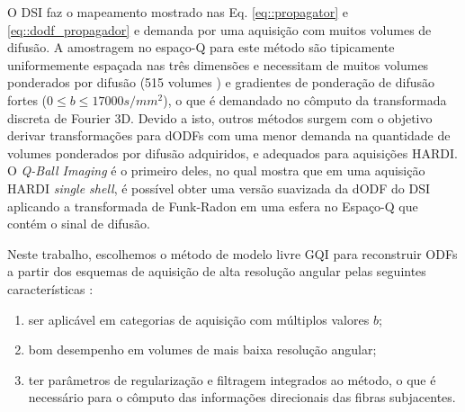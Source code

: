 \documentclass[
    12pt,                %
    oneside,            %
    a4paper,            %
    english,            %
    french,                %
    spanish,            %
    brazil                %
    ]{abntex2}
\begin{document}

O DSI \cite{wedeen2005} faz o mapeamento mostrado nas Eq. \ref{eq::propagator} e \ref{eq::dodf_propagador} e demanda por uma aquisição com muitos volumes de difusão. A amostragem no espaço-Q para este método são tipicamente uniformemente espaçada nas três dimensões e necessitam de muitos volumes ponderados por difusão (515 volumes \cite{wedeen2005}) e gradientes de ponderação de difusão fortes ($0 \leq b \leq 17000 s/mm^2$), o que é demandado no cômputo da transformada discreta de Fourier 3D. Devido a isto, outros métodos surgem com o objetivo derivar transformações para dODFs com uma menor demanda na quantidade de volumes ponderados por difusão adquiridos, e adequados para aquisições HARDI. O \textit{Q-Ball Imaging} é o primeiro deles, no qual  mostra que em uma aquisição HARDI \textit{single shell}, é possível obter uma versão suavizada da dODF do DSI aplicando a transformada de Funk-Radon em uma esfera no Espaço-Q que contém o sinal de difusão.



Neste trabalho, escolhemos o método de modelo livre GQI para reconstruir ODFs a partir dos esquemas de aquisição de alta resolução angular pelas seguintes características \cite{yeh2010}:

\begin{enumerate}
    \item ser aplicável em categorias de aquisição com múltiplos valores $b$;
    \item bom desempenho em volumes de mais baixa resolução angular;
    \item ter parâmetros de regularização e filtragem integrados ao método, o que é necessário para o cômputo das informações direcionais das fibras subjacentes.
\end{enumerate}
\end{document}
